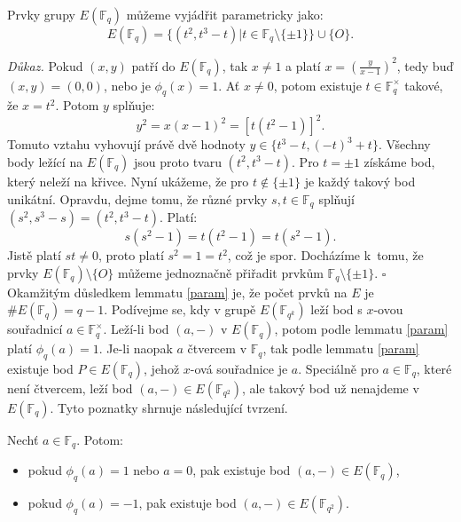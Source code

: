 \documentclass[12pt]{report}
\begin{document}
\begin{lemma}\label{param}
Prvky grupy $E(\mathbb{F}_q)$ můžeme vyjádřit parametricky jako: $$E(\mathbb{F}_q) = \lbrace (t^2,t^3-t) \vert t \in \mathbb{F}_q \setminus \lbrace \pm 1 \rbrace  \rbrace \cup \lbrace O \rbrace.$$
\end{lemma}
\noindent \textit{Důkaz.} Pokud $(x,y)$ patří do $E(\mathbb{F}_q)$, tak $x \neq 1$ a platí $x =\left( \frac{y}{x-1}\right)^2$, tedy buď $(x,y) = (0,0)$, nebo je $\phi_q (x) = 1$. Ať $x \neq 0$, potom existuje $t \in \mathbb{F}_q ^{\times}$ takové, že $x = t^2$. Potom $y$ splňuje:
$$y^2 = x (x-1)^2 = \left[t(t^2-1)\right]^2.$$
Tomuto vztahu vyhovují právě dvě hodnoty $y \in \lbrace t^3-t, (-t)^3+t \rbrace$. Všechny body ležící na $E(\mathbb{F}_q)$ jsou proto tvaru $(t^2,t^3-t)$. Pro $t = \pm 1$ získáme bod, který neleží na křivce. Nyní ukážeme, že pro $t \not\in \lbrace \pm 1 \rbrace$ je každý takový bod unikátní. Opravdu, dejme tomu, že různé prvky $s,t \in \mathbb{F}_q$ splňují $(s^2,s^3-s) = (t^2,t^3-t)$. Platí:
$$s(s^2-1) = t(t^2-1) = t(s^2-1).$$
Jistě platí $st \neq 0$, proto platí $s^2=1=t^2$, což je spor. Docházíme k~tomu, že prvky $E(\mathbb{F}_q) \setminus \lbrace O \rbrace$ můžeme jednoznačně přiřadit prvkům $\mathbb{F}_q \setminus \lbrace \pm 1 \rbrace$. \hfill $\square$\\

Okamžitým důsledkem lemmatu \ref{param} je, že počet prvků na $E$ je $\# E(\mathbb{F}_q)= q-1$. 
Podívejme se, kdy v grupě $E(\mathbb{F}_{q^k})$ leží bod s $x$-ovou souřadnicí $a \in \mathbb{F}_q ^{\times}$. Leží-li bod $(a,-)$ v $E(\mathbb{F}_q)$, potom podle lemmatu \ref{param} platí $\phi_q(a)=1$. Je-li naopak $a$ čtvercem v $\mathbb{F}_q$, tak podle lemmatu \ref{param} existuje bod $P \in E(\mathbb{F}_q)$, jehož $x$-ová souřadnice je $a$. Speciálně pro $a \in \mathbb{F}_q$, které není čtvercem, leží bod $(a,-) \in E(\mathbb{F}_{q^2})$, ale takový bod už nenajdeme v $E(\mathbb{F}_q)$. Tyto poznatky shrnuje následující tvrzení.

\begin{veta}\label{Fq2}
Nechť $a \in \mathbb{F}_q$. Potom:
\begin{itemize}
\item pokud $\phi_q(a) = 1$ nebo $a=0$, pak existuje bod $(a,-) \in E(\mathbb{F}_q)$,
\item pokud $\phi_q(a) = -1$, pak existuje bod $(a,-) \in E(\mathbb{F}_{q^2})$.
\end{itemize}
\end{veta}
\end{document}
